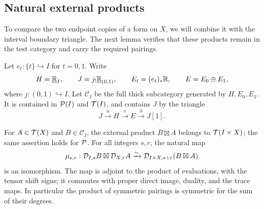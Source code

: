 \subsection{Natural external products}

To compare the two endpoint copies of a form on $X$, we will combine
it with the interval boundary triangle.  The next lemma verifies that
these products remain in the test category and carry the required
pairings.

Let $e_t:\{t\}\hookrightarrow I$ for $t=0,1$.
Write
\begin{equation}
 \label{cat:interval-objects}
 H=\underline{\mathbb R}_{I},\qquad
 J=j_!\underline{\mathbb R}_{(0,1)},\qquad
 E_t=(e_t)_*\mathbb R,\qquad E=E_0\oplus E_1,
\end{equation}
where $j:(0,1)\hookrightarrow I$.  Let $\mathcal C_I$ be the full
thick subcategory generated by $H,E_0,E_1$.  It is contained in
$\mathcal P(I)$ and $\mathcal T(I)$, and contains $J$ by the triangle
\begin{equation}
 \label{cat:interval-triangle}
 J\xrightarrow{u}H\xrightarrow{v}E
 \xrightarrow{\partial}J[1].
\end{equation}

\begin{lemma}
\label{cat:interval-products}
For $A\in\mathcal T(X)$ and $B\in\mathcal C_I$, the external product
$B\boxtimes A$ belongs to $\mathcal T(I\times X)$; the same assertion holds
for $\mathcal P$.  For all integers $s,r$, the natural map
\begin{equation}
 \label{cat:external-duality}
 \mu_{s,r}:\mathcal D_{I,s}B\boxtimes\mathcal D_{X,r}A
 \xrightarrow{\sim}
 \mathcal D_{I\times X,s+r}(B\boxtimes A)
\end{equation}
is an isomorphism.  The map is adjoint to the product of evaluations,
with the tensor shift signs; it commutes with proper direct image,
duality, and the trace maps.  In particular the product of symmetric
pairings is symmetric for the sum of their degrees.
\end{lemma}

